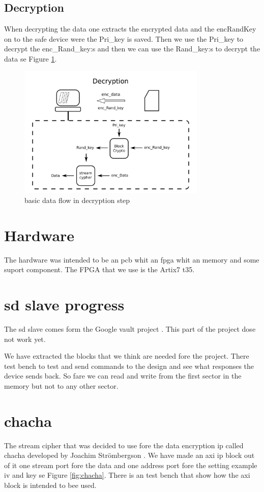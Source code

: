 \documentclass[]{article}
\begin{document}
\subsection{Decryption}
When decrypting the data one extracts the encrypted data and the \acrfull{encRandKey} on to the safe device were the Pri\_key is saved.
Then we use the Pri\_key to decrypt the enc\_Rand\_key:s and then we can use the Rand\_key:s to decrypt the data se Figure \ref{fig:decrypt}.

\begin{figure}[h]
	\centering
	\includegraphics[width=0.8\textwidth]{ilustrations/decryption.pdf}
	\caption{basic data flow in decryption step}
	\label{fig:decrypt}
\end{figure}



\section{Hardware}
The hardware was intended to be an \acrfull{pcb} whit an \acrfull{fpga} whit an memory and some suport component.
The FPGA that we use is the Artix7 t35.


\section{sd slave progress}
The sd slave comes form the Google vault project \cite{GV}.
This part of the project dose not work yet.

We have extracted the blocks that we think are needed fore the project.
There test bench to test and send commands to the design and see what responses the device sends back.
So fare we can read and write from the first sector in the memory but not to any other sector.

\section{chacha}
The stream cipher that was decided to use fore the data encryption ip called chacha \cite{chacha} developed by Joachim Strömbergson \cite{joachim}.  
We have made an axi ip block out of it one stream port fore the data and one address port fore the setting example iv and key se Figure \ref{fig:chacha}.
There is an test bench that show how the axi block is intended to bee used.
\end{document}
